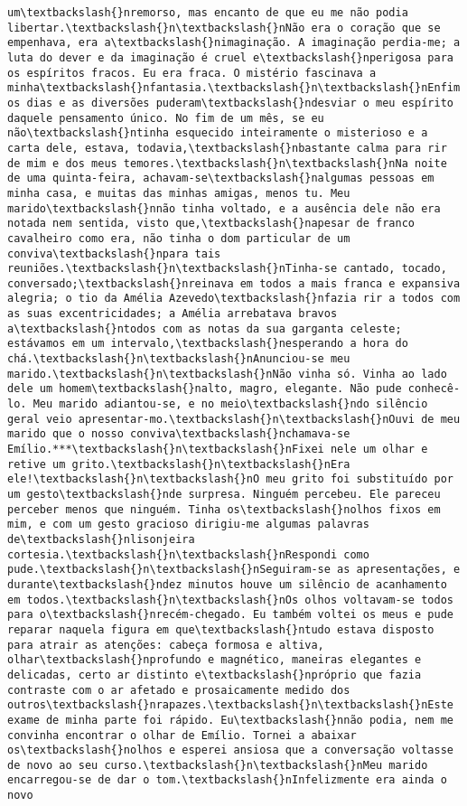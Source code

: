 \documentclass[11pt]{article}
\begin{document}
\begin{Verbatim}[commandchars=\\\{\}]
um\textbackslash{}nremorso, mas encanto de que eu me não podia libertar.\textbackslash{}n\textbackslash{}nNão era o coração que se empenhava, era a\textbackslash{}nimaginação. A imaginação perdia-me; a luta do dever e da imaginação é cruel e\textbackslash{}nperigosa para os espíritos fracos. Eu era fraca. O mistério fascinava a minha\textbackslash{}nfantasia.\textbackslash{}n\textbackslash{}nEnfim os dias e as diversões puderam\textbackslash{}ndesviar o meu espírito daquele pensamento único. No fim de um mês, se eu não\textbackslash{}ntinha esquecido inteiramente o misterioso e a carta dele, estava, todavia,\textbackslash{}nbastante calma para rir de mim e dos meus temores.\textbackslash{}n\textbackslash{}nNa noite de uma quinta-feira, achavam-se\textbackslash{}nalgumas pessoas em minha casa, e muitas das minhas amigas, menos tu. Meu marido\textbackslash{}nnão tinha voltado, e a ausência dele não era notada nem sentida, visto que,\textbackslash{}napesar de franco cavalheiro como era, não tinha o dom particular de um conviva\textbackslash{}npara tais reuniões.\textbackslash{}n\textbackslash{}nTinha-se cantado, tocado, conversado;\textbackslash{}nreinava em todos a mais franca e expansiva alegria; o tio da Amélia Azevedo\textbackslash{}nfazia rir a todos com as suas excentricidades; a Amélia arrebatava bravos a\textbackslash{}ntodos com as notas da sua garganta celeste; estávamos em um intervalo,\textbackslash{}nesperando a hora do chá.\textbackslash{}n\textbackslash{}nAnunciou-se meu marido.\textbackslash{}n\textbackslash{}nNão vinha só. Vinha ao lado dele um homem\textbackslash{}nalto, magro, elegante. Não pude conhecê-lo. Meu marido adiantou-se, e no meio\textbackslash{}ndo silêncio geral veio apresentar-mo.\textbackslash{}n\textbackslash{}nOuvi de meu marido que o nosso conviva\textbackslash{}nchamava-se Emílio.***\textbackslash{}n\textbackslash{}nFixei nele um olhar e retive um grito.\textbackslash{}n\textbackslash{}nEra ele!\textbackslash{}n\textbackslash{}nO meu grito foi substituído por um gesto\textbackslash{}nde surpresa. Ninguém percebeu. Ele pareceu perceber menos que ninguém. Tinha os\textbackslash{}nolhos fixos em mim, e com um gesto gracioso dirigiu-me algumas palavras de\textbackslash{}nlisonjeira cortesia.\textbackslash{}n\textbackslash{}nRespondi como pude.\textbackslash{}n\textbackslash{}nSeguiram-se as apresentações, e durante\textbackslash{}ndez minutos houve um silêncio de acanhamento em todos.\textbackslash{}n\textbackslash{}nOs olhos voltavam-se todos para o\textbackslash{}nrecém-chegado. Eu também voltei os meus e pude reparar naquela figura em que\textbackslash{}ntudo estava disposto para atrair as atenções: cabeça formosa e altiva, olhar\textbackslash{}nprofundo e magnético, maneiras elegantes e delicadas, certo ar distinto e\textbackslash{}npróprio que fazia contraste com o ar afetado e prosaicamente medido dos outros\textbackslash{}nrapazes.\textbackslash{}n\textbackslash{}nEste exame de minha parte foi rápido. Eu\textbackslash{}nnão podia, nem me convinha encontrar o olhar de Emílio. Tornei a abaixar os\textbackslash{}nolhos e esperei ansiosa que a conversação voltasse de novo ao seu curso.\textbackslash{}n\textbackslash{}nMeu marido encarregou-se de dar o tom.\textbackslash{}nInfelizmente era ainda o novo 
\end{Verbatim}
\end{document}

